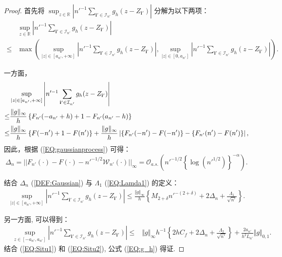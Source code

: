 \documentclass[a4paper,openay,14pt]{ctexbook}
\numberwithin{equation}{section}
\numberwithin{lem}{section}
\begin{document}
\begin{proof}
首先将 $\sup_{z\in\mathbb{R}}\left\vert n'^{-1}\sum_{\mathbf{i}' \in\mathcal{I}_{n'}}g_h(z-Z_{\mathbf{i}'})\right\vert$ 分解为以下两项：
\begin{align*}
     &\sup_{z\in\mathbb{R}}\left\vert n'^{-1}\sum_{\mathbf{i}' \in\mathcal{I}_{n'}}g_h(z-Z_{\mathbf{i}'})\right\vert\\
     \leq& \max\left(\sup_{\vert z\vert\in\left[a_{n'},+\infty\right]}\left\vert n'^{-1}\sum_{\mathbf{i}'\in\mathcal{I}_{n'}}g_h(z-Z_{\mathbf{i}'})\right\vert,
    \sup_{\vert z\vert\in\left[0,a_{n'}\right]}\left\vert n'^{-1}\sum_{\mathbf{i}'\in\mathcal{I}_{n'}}g_h(z-Z_{\mathbf{i}'})\right\vert\right).
\end{align*}

一方面，
\begin{align*}
    &\sup_{\vert z\vert\in\left[a_{n'},+\infty\right]}\left\vert n'^{-1}\sum_{\mathbf{i}'\in\mathcal{I}_{n'}}g_h(z-Z_{\mathbf{i}'})\right\vert  \\
    \leq &\frac{\Vert g\Vert_{\infty}}{h}\left\{F_{n'}(-a_{n'}+h)+1-F_{n'}(a_{n'}-h)\right\} \notag\\
    \leq &\frac{\Vert g\Vert_{\infty}}{h}\left\{F(-n')+1-F(n')\right\} + \frac{\Vert g\Vert_{\infty}}{h}\left\vert\left\{F_{n'}(-n')-F(-n')\right \}-\left \{F_{n'}(n')-F(n')\right\} \right\vert,
\end{align*}
因此，根据 (\ref{EQ:gaussianprocess}) 可得：
\begin{equation} \label{DEF:Gaussian}
\Delta_n=||F_{n'}(\cdot)-F(\cdot)-n'^{-1/2}\mathcal{W}_{n'}(\cdot)||_{\infty} =\mathcal{O}_{a.s.}\left(n'^{-1/2}\left\{\log (n'^{1/2})\right\}^{-\alpha}\right).
\end{equation}

结合 $\Delta_n$ (\ref{DEF:Gaussian}) 与 $\Lambda_1$ (\ref{EQ:Lamda1}) 的定义：
\begin{align} \label{EQ:Situ1}
    \sup_{\vert z\vert\in\left[a_{n'},+\infty\right]}\left\vert n'^{-1}\sum_{\mathbf{i}'\in\mathcal{I}_{n'}}g_h(z-Z_{\mathbf{i}'})\right\vert \leq \frac{\Vert g\Vert_{\infty}}{h}\left\{M_{2+\delta}n'^{-(2+\delta)} + 2\Delta_n + \frac{\Lambda_1}{\sqrt{n'}}\right\}.
\end{align}

另一方面, 可以得到：
\begin{align} \label{EQ:Situ2}
    &\sup_{z\in\left[-a_{n'},a_{n'}\right]}\left\vert n'^{-1}\sum_{\mathbf{i}'\in\mathcal{I}_{n'}}g_h(z-Z_{\mathbf{i}'})\right\vert\leq &\Vert g\Vert_{\infty}h^{-1}\left\{2hC_f + 2\Delta_n + \frac{\Lambda_2}{\sqrt{n'}}\right\} + \frac{2a_{n'}}{h^2L_{n'}}\Vert g\Vert_{0,1}.
\end{align}
结合 (\ref{EQ:Situ1}) 和 (\ref{EQ:Situ2}), 公式 (\ref{EQ:g_h}) 得证.


\end{proof}
\end{document}
